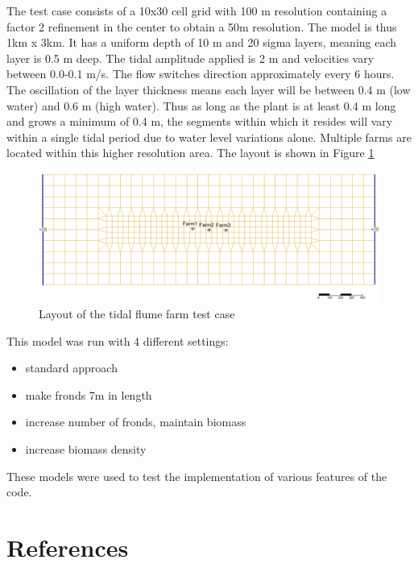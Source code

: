 \documentclass{deltares_manual}
\begin{document}
The test case consists of a 10x30 cell grid with 100 m resolution containing a factor 2 refinement  in the center to obtain a 50m resolution. The model is thus 1km x 3km. It has a uniform depth of 10 m and 20 sigma layers, meaning each layer is 0.5 m deep. The tidal amplitude applied is 2 m and velocities vary between 0.0-0.1 m/s. The flow switches direction approximately every 6 hours. The oscillation of the layer thickness means each layer will be between 0.4 m (low water) and 0.6 m (high water). Thus as long as the plant is at least 0.4 m long and grows a minimum of 0.4 m, the segments within which it resides will vary within a single tidal period due to water level variations alone. Multiple farms are located within this higher resolution area. The layout is shown in Figure \ref{fig:tidalflumefarm}

\begin{figure}[H]
	\centering
	\includegraphics[width=1\linewidth]{figures/tidal_flume_farm}
	\caption{Layout of the tidal flume farm test case}
	\label{fig:tidalflumefarm}
\end{figure}

This model was run with 4 different settings:
\begin{itemize}
	\item standard approach
	\item make fronds 7m in length
	\item increase number of fronds, maintain biomass
	\item increase biomass density
\end{itemize}

These models were used to test the implementation of various features of the code.

\chapter{References}

\end{document}
